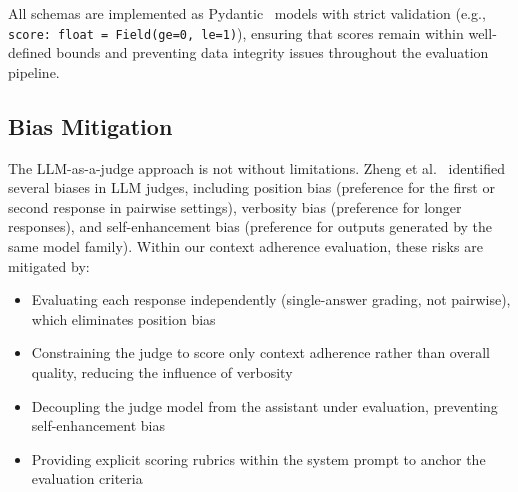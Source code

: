 \documentclass[11pt,a4paper]{article}
\begin{document}
All schemas are implemented as Pydantic~\cite{pydantic2024} models with strict validation (e.g., \texttt{score: float = Field(ge=0, le=1)}), ensuring that scores remain within well-defined bounds and preventing data integrity issues throughout the evaluation pipeline.

\subsection{Bias Mitigation}

The LLM-as-a-judge approach is not without limitations. Zheng et al.~\cite{zheng2023judging} identified several biases in LLM judges, including position bias (preference for the first or second response in pairwise settings), verbosity bias (preference for longer responses), and self-enhancement bias (preference for outputs generated by the same model family). Within our context adherence evaluation, these risks are mitigated by:

\begin{itemize}
    \item Evaluating each response independently (single-answer grading, not pairwise), which eliminates position bias
    \item Constraining the judge to score only context adherence rather than overall quality, reducing the influence of verbosity
    \item Decoupling the judge model from the assistant under evaluation, preventing self-enhancement bias
    \item Providing explicit scoring rubrics within the system prompt to anchor the evaluation criteria
\end{itemize}



\end{document}
